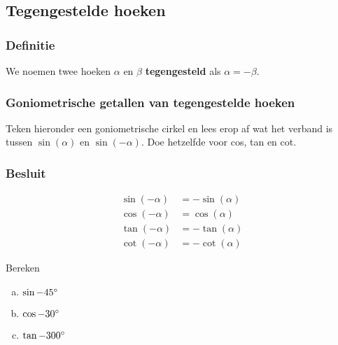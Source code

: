 \documentclass[a4paper,12pt]{article}
\begin{document}
\begin{theorie}

\pagebreak
\subsection{Tegengestelde hoeken}
\subsubsection*{Definitie}
We noemen twee hoeken $\alpha$ en $\beta$ \textbf{tegengesteld} als $\alpha=-\beta$.
\subsubsection*{Goniometrische getallen van tegengestelde hoeken}
Teken hieronder een goniometrische cirkel en lees erop af wat het verband is tussen $\sin(\alpha)$ en $\sin(-\alpha)$. Doe hetzelfde voor cos, tan en cot.
\vspace*{7cm}
\subsubsection*{Besluit}
\begin{align*}
  \sin(-\alpha)&=-\sin(\alpha)\\
  \cos(-\alpha)&=\cos(\alpha)\\
  \tan(-\alpha)&=-\tan(\alpha)\\
  \cot(-\alpha)&=-\cot(\alpha)
\end{align*}

\end{theorie}

\begin{oefening}
Bereken
\begin{enumerate}[(a)]
  \item $\sin-45^\circ$
  \item $\cos-30^\circ$
  \item $\tan-300^\circ$
\end{enumerate}
\end{oefening}
\end{document}
